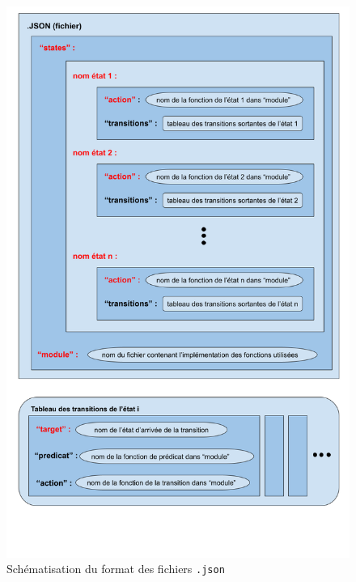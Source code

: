 \documentclass[a4paper,french]{article}
\begin{document}
\begin{figure}[H]
    \centering
    \includegraphics[scale=0.4]{figures/schema_JSON.png}
    \caption{Schématisation du format des fichiers \texttt{.json}}
    \label{fig:json}
\end{figure}
\end{document}
